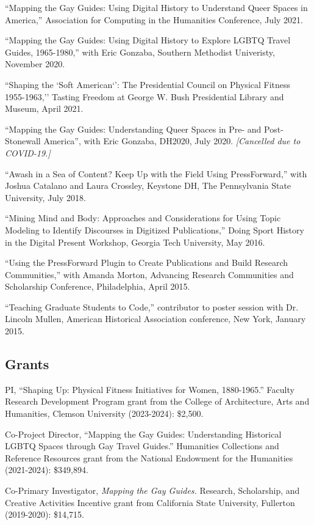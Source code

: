 \documentclass[11pt]{article}
\begin{document}
``Mapping the Gay Guides: Using Digital History to Understand Queer Spaces in America,'' Association for Computing in the Humanities Conference, July 2021.

``Mapping the Gay Guides: Using Digital History to Explore LGBTQ Travel Guides, 1965-1980,'' with Eric Gonzaba, Southern Methodist Univeristy, November 2020.

``Shaping the `Soft American`': The Presidential Council on Physical Fitness 1955-1963,'' Tasting Freedom at George W. Bush Presidential Library and Museum, April 2021.

``Mapping the Gay Guides: Understanding Queer Spaces in Pre- and Post-Stonewall America'', with Eric Gonzaba, DH2020, July 2020. \emph{[Cancelled due to COVID-19.]}

``Awash in a Sea of Content? Keep Up with the Field Using PressForward,'' with Joshua Catalano and Laura Crossley, Keystone DH, The Pennsylvania State University, July 2018.

``Mining Mind and Body: Approaches and Considerations for Using Topic Modeling to Identify Discourses in Digitized Publications,'' Doing Sport History in the Digital Present Workshop, Georgia Tech University, May 2016.

``Using the PressForward Plugin to Create Publications and Build Research Communities,'' with Amanda Morton, Advancing Research Communities and Scholarship Conference, Philadelphia, April 2015.

``Teaching Graduate Students to Code,'' contributor to poster session with Dr. Lincoln Mullen, American Historical Association conference, New York, January 2015.

\subsection{Grants}
PI, ``Shaping Up: Physical Fitness Initiatives for Women, 1880-1965.'' Faculty Research Development Program grant from the College of Architecture, Arts and Humanities, Clemson University (2023-2024): \$2,500.

Co-Project Director, ``Mapping the Gay Guides: Understanding Historical LGBTQ Spaces through Gay Travel Guides.'' Humanities Collections and Reference Resources grant from the National Endowment for the Humanities (2021-2024): \$349,894.

Co-Primary Investigator, \emph{Mapping the Gay Guides.} Research, Scholarship, and Creative Activities Incentive grant from California State University, Fullerton (2019-2020): \$14,715.
\end{document}
